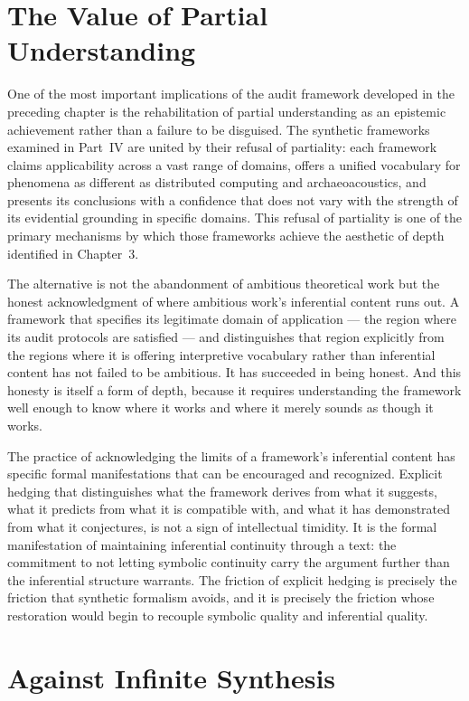 \documentclass[12pt, openright, twoside]{book}
\begin{document}
\section{The Value of Partial Understanding}

One of the most important implications of the audit framework developed in
the preceding chapter is the rehabilitation of partial understanding as an
epistemic achievement rather than a failure to be disguised. The synthetic
frameworks examined in Part~IV are united by their refusal of partiality:
each framework claims applicability across a vast range of domains, offers
a unified vocabulary for phenomena as different as distributed computing
and archaeoacoustics, and presents its conclusions with a confidence that
does not vary with the strength of its evidential grounding in specific
domains. This refusal of partiality is one of the primary mechanisms by
which those frameworks achieve the aesthetic of depth identified in Chapter~3.

The alternative is not the abandonment of ambitious theoretical work but
the honest acknowledgment of where ambitious work's inferential content
runs out. A framework that specifies its legitimate domain of application
--- the region where its audit protocols are satisfied --- and distinguishes
that region explicitly from the regions where it is offering interpretive
vocabulary rather than inferential content has not failed to be ambitious.
It has succeeded in being honest. And this honesty is itself a form of
depth, because it requires understanding the framework well enough to know
where it works and where it merely sounds as though it works.

The practice of acknowledging the limits of a framework's inferential
content has specific formal manifestations that can be encouraged and
recognized. Explicit hedging that distinguishes what the framework derives
from what it suggests, what it predicts from what it is compatible with,
and what it has demonstrated from what it conjectures, is not a sign of
intellectual timidity. It is the formal manifestation of maintaining
inferential continuity through a text: the commitment to not letting
symbolic continuity carry the argument further than the inferential
structure warrants. The friction of explicit hedging is precisely the
friction that synthetic formalism avoids, and it is precisely the friction
whose restoration would begin to recouple symbolic quality and inferential
quality.

\section{Against Infinite Synthesis}
\end{document}
